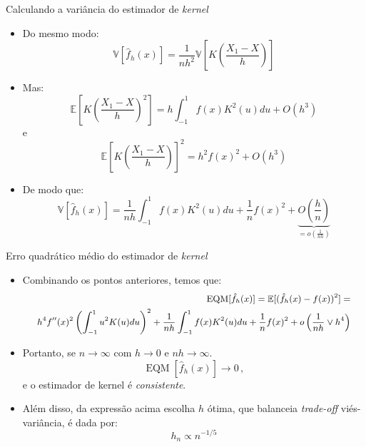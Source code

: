 \documentclass[11pt]{beamer}
\begin{document}
	\begin{frame}{Calculando a variância do estimador de \textit{kernel}}
		\begin{itemize}
			\item Do mesmo modo:
			$$		\mathbb{V}[\hat{f}_h(x)] = \frac{1}{nh^2}\mathbb{V}\left[K\left(\frac{X_1 - X}{h}\right)\right]$$
			\item Mas:
			$$\mathbb{E}\left[K\left(\frac{X_1 - X}{h}\right)^2\right] = h \int_{-1}^{1} f(x) K^2(u) du + O(h^3)$$
			e$$\mathbb{E}\left[K\left(\frac{X_1 - X}{h}\right)\right]^2 = h^2f(x)^2  + O(h^3)$$
			\item De modo que:
			$$\mathbb{V}[\hat{f}_h(x)] = \frac{1}{nh} \int_{-1}^{1} f(x) K^2(u) du+ \frac{1}{n}f(x)^2 + \underbrace{O\left(\frac{h}{n}\right)}_{=o\left(\frac{1}{nh}\right)}$$		
		\end{itemize}
		

	\end{frame}
	\begin{frame}{Erro quadrático médio do estimador de \textit{kernel}}
		\begin{itemize}
			\item Combinando os pontos anteriores, temos que:
			\begin{equation*}
				\small 
				\begin{aligned}
					\operatorname{EQM}[\hat{f}_h(x)] = \mathbb{E}[(\hat{f}_h(x) - f(x))^2] = \\ 
					h^4 f''(x)^2 \left(\int_{-1}^{1}u^2 K(u)du\right)^2 + \frac{1}{nh} \int_{-1}^{1} f(x) K^2(u) du+ \frac{1}{n}f(x)^2 + o\left(\frac{1}{nh} \lor h^4\right)
				\end{aligned}
			\end{equation*}
			\item Portanto, se $n \to \infty$ com $h\to 0$ e $nh \to \infty$.
			$$\operatorname{EQM}[\hat{f}_h(x)] \to 0\, ,$$
			e o estimador de kernel é \textit{consistente}.
			\item Além disso, da expressão acima escolha $h$ ótima, que balanceia \textit{trade-off} viés-variância,  é dada por:
			$$h_n \propto n^{-1/5} $$ 
			
		\end{itemize}
	\end{frame}
\end{document}

